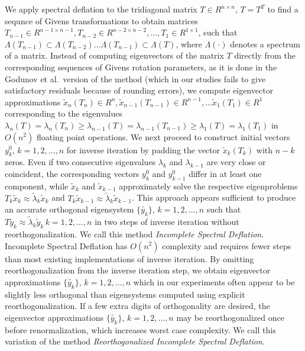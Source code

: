 \documentclass{report}
\begin{document}
We apply spectral deflation to the tridiagonal matrix $T \in
R^{n\times n},\, T = T^T$ to find a sequnce of Givens
transformations to obtain matrices $T_{n-1} \in R^{n-1 \times
n-1}, T_{n-2} \in R^{n-2 \times n-2},\ldots, T_{1} \in R^{1\times
1}$, such that $\Lambda(T_{n-1}) \subset \Lambda(T_{n-2})\ldots
\Lambda(T_{n-1}) \subset \Lambda(T)$, where $\Lambda(\cdot)$
denotes a spectrum of a matrix. Instead of computing eigenvectors
of the matrix $T$ directly from the corresponding sequences of
Givens rotation parameters, as it is done in the Godunov et al.\
version of the method (which in our studies fails to give
satisfactory residuals because of rounding errors), we compute
eigenvector approximations $\tilde{x}_n(T_n) \in R^{n},
\tilde{x}_{n-1}(T_{n-1}) \in R^{n-1}, \ldots \tilde{x}_1(T_1) \in
R^{1}$ corresponding to the eigenvalues
$\lambda_n(T)=\lambda_n(T_n) \geq
\lambda_{n-1}(T)=\lambda_{n-1}(T_{n-1}) \geq
\lambda_1(T)=\lambda_1(T_1)$ in $O(n^2)$ floating point
operations. We next proceed to construct initial vectors
${y^0_k},\, k = 1, 2, \ldots, n$ for inverse iteration by padding
the vector $\tilde{x}_k(T_{k})$ with $n-k$ zeros. Even if two
consecutive eigenvalues $\lambda_k$ and $\lambda_{k-1}$ are very
close or coincident, the corresponding vectors ${y^0_k}$ and
${y^0_{k-1}}$ differ in at least one component, while
$\tilde{x}_k$ and $\tilde{x}_{k-1}$ approximately solve the
respective eigenproblems $T_{k} \tilde{x}_{k} \approx
\tilde{\lambda}_{k} \tilde{x}_k$ and $T_{k} \tilde{x}_{k-1}
\approx \tilde{\lambda}_{k} \tilde{x}_{k-1}$. This approach
appears sufficient to produce an accurate orthogonal eigensystem
$\{\tilde{y_k}\},\, k = 1,2, \ldots, n$ such that $T \tilde{y}_k
\approx \tilde{\lambda}_k \tilde{y}_k\, k = 1,2, \ldots, n$ in
two steps of inverse iteration without reorthogonalization. We
call this method \emph{Incomplete Spectral Deflation}.
Incomplete Spectral Deflation has $O(n^2)$ complexity and
requires fewer steps than most existing implementations of
inverse iteration. By omitting reorthogonalization from the
inverse iteration step, we obtain eigenvector approximations
$\{\tilde{y_k}\},\, k = 1,2, \ldots, n$ which in our experiments
often appear to be slightly less orthogonal than eigensystems
computed using explicit reorthogonalization. If a few extra
digits of orthogonality are desired, the eigenvector
approximations $\{\tilde{y_k}\},\, k = 1,2, \ldots, n$ may be
reorthogonalized once before renormalization, which increases
worst case complexity. We call this variation of the method
\emph{Reorthogonalized Incomplete Spectral Deflation}.
\end{document}
